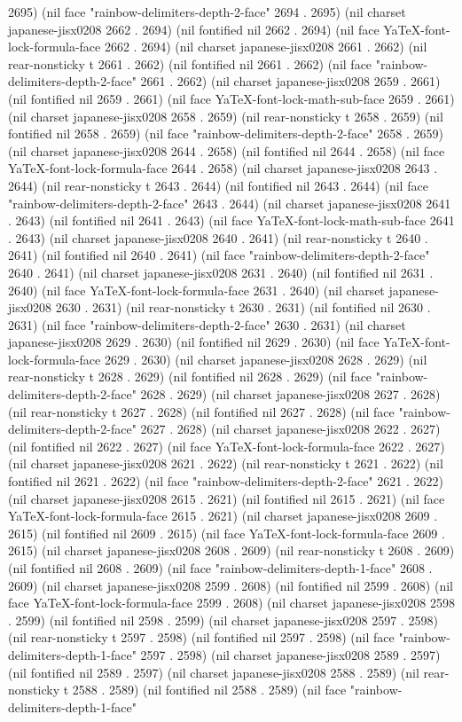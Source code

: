 2695) (nil face "rainbow-delimiters-depth-2-face" 2694 . 2695) (nil charset japanese-jisx0208 2662 . 2694) (nil fontified nil 2662 . 2694) (nil face YaTeX-font-lock-formula-face 2662 . 2694) (nil charset japanese-jisx0208 2661 . 2662) (nil rear-nonsticky t 2661 . 2662) (nil fontified nil 2661 . 2662) (nil face "rainbow-delimiters-depth-2-face" 2661 . 2662) (nil charset japanese-jisx0208 2659 . 2661) (nil fontified nil 2659 . 2661) (nil face YaTeX-font-lock-math-sub-face 2659 . 2661) (nil charset japanese-jisx0208 2658 . 2659) (nil rear-nonsticky t 2658 . 2659) (nil fontified nil 2658 . 2659) (nil face "rainbow-delimiters-depth-2-face" 2658 . 2659) (nil charset japanese-jisx0208 2644 . 2658) (nil fontified nil 2644 . 2658) (nil face YaTeX-font-lock-formula-face 2644 . 2658) (nil charset japanese-jisx0208 2643 . 2644) (nil rear-nonsticky t 2643 . 2644) (nil fontified nil 2643 . 2644) (nil face "rainbow-delimiters-depth-2-face" 2643 . 2644) (nil charset japanese-jisx0208 2641 . 2643) (nil fontified nil 2641 . 2643) (nil face YaTeX-font-lock-math-sub-face 2641 . 2643) (nil charset japanese-jisx0208 2640 . 2641) (nil rear-nonsticky t 2640 . 2641) (nil fontified nil 2640 . 2641) (nil face "rainbow-delimiters-depth-2-face" 2640 . 2641) (nil charset japanese-jisx0208 2631 . 2640) (nil fontified nil 2631 . 2640) (nil face YaTeX-font-lock-formula-face 2631 . 2640) (nil charset japanese-jisx0208 2630 . 2631) (nil rear-nonsticky t 2630 . 2631) (nil fontified nil 2630 . 2631) (nil face "rainbow-delimiters-depth-2-face" 2630 . 2631) (nil charset japanese-jisx0208 2629 . 2630) (nil fontified nil 2629 . 2630) (nil face YaTeX-font-lock-formula-face 2629 . 2630) (nil charset japanese-jisx0208 2628 . 2629) (nil rear-nonsticky t 2628 . 2629) (nil fontified nil 2628 . 2629) (nil face "rainbow-delimiters-depth-2-face" 2628 . 2629) (nil charset japanese-jisx0208 2627 . 2628) (nil rear-nonsticky t 2627 . 2628) (nil fontified nil 2627 . 2628) (nil face "rainbow-delimiters-depth-2-face" 2627 . 2628) (nil charset japanese-jisx0208 2622 . 2627) (nil fontified nil 2622 . 2627) (nil face YaTeX-font-lock-formula-face 2622 . 2627) (nil charset japanese-jisx0208 2621 . 2622) (nil rear-nonsticky t 2621 . 2622) (nil fontified nil 2621 . 2622) (nil face "rainbow-delimiters-depth-2-face" 2621 . 2622) (nil charset japanese-jisx0208 2615 . 2621) (nil fontified nil 2615 . 2621) (nil face YaTeX-font-lock-formula-face 2615 . 2621) (nil charset japanese-jisx0208 2609 . 2615) (nil fontified nil 2609 . 2615) (nil face YaTeX-font-lock-formula-face 2609 . 2615) (nil charset japanese-jisx0208 2608 . 2609) (nil rear-nonsticky t 2608 . 2609) (nil fontified nil 2608 . 2609) (nil face "rainbow-delimiters-depth-1-face" 2608 . 2609) (nil charset japanese-jisx0208 2599 . 2608) (nil fontified nil 2599 . 2608) (nil face YaTeX-font-lock-formula-face 2599 . 2608) (nil charset japanese-jisx0208 2598 . 2599) (nil fontified nil 2598 . 2599) (nil charset japanese-jisx0208 2597 . 2598) (nil rear-nonsticky t 2597 . 2598) (nil fontified nil 2597 . 2598) (nil face "rainbow-delimiters-depth-1-face" 2597 . 2598) (nil charset japanese-jisx0208 2589 . 2597) (nil fontified nil 2589 . 2597) (nil charset japanese-jisx0208 2588 . 2589) (nil rear-nonsticky t 2588 . 2589) (nil fontified nil 2588 . 2589) (nil face "rainbow-delimiters-depth-1-face" 